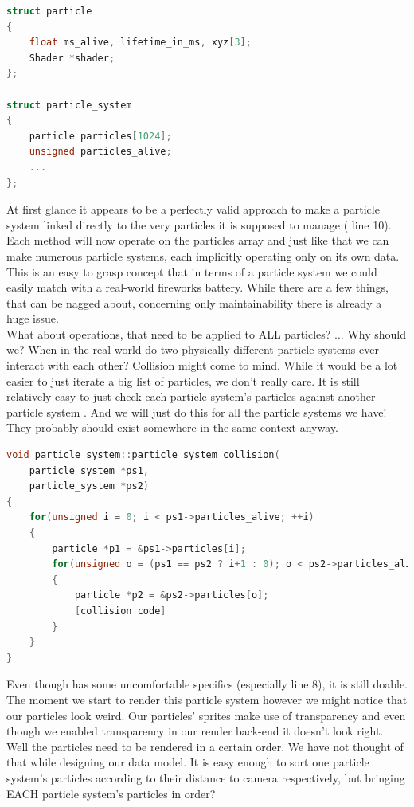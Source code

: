  \begin{lstlisting}[language=C++,name={ OOP typical, simplified particle system implementation},label={particle_system}]
struct particle
{
	float ms_alive, lifetime_in_ms, xyz[3];
	Shader *shader;
};

struct particle_system
{
	particle particles[1024];
	unsigned particles_alive;
	...
};
\end{lstlisting}
At first glance it appears to be a perfectly valid approach to make a particle system linked directly to the very particles it is supposed to manage ( line 10). Each method will now operate on the particles array and just like that we can make numerous particle systems, each implicitly operating only on its own data. This is an easy to grasp concept that in terms of a particle system we could easily match with a real-world fireworks battery. While there are a few things, that can be nagged about, concerning only maintainability there is already a huge issue.\\
What about operations, that need to be applied to ALL particles? ... Why should we? When in the real world do two physically different particle systems ever interact with each other? Collision might come to mind. While it would be a lot easier to just iterate a big list of particles, we don't really care. It is still relatively easy to just check each particle system's particles against another particle system . And we will just do this for all the particle systems we have! They probably should exist somewhere in the same context anyway.\\
 \begin{lstlisting}[language=C++,name={Example code how OOP could handle collision between different particle systems' particles},label={collision}]
void particle_system::particle_system_collision(
	particle_system *ps1,
	particle_system *ps2)
{
	for(unsigned i = 0; i < ps1->particles_alive; ++i)
	{
		particle *p1 = &ps1->particles[i];
		for(unsigned o = (ps1 == ps2 ? i+1 : 0); o < ps2->particles_alive; ++o)
		{
			particle *p2 = &ps2->particles[o];
			[collision code]
		}
	}
}
\end{lstlisting}
Even though  has some uncomfortable specifics (especially line 8), it is still doable. The moment we start to render this particle system however we might notice that our particles look weird. Our particles' sprites make use of transparency and even though we enabled transparency in our render back-end it doesn't look right. Well the particles need to be rendered in a certain order. We have not thought of that while designing our data model. It is easy enough to sort one particle system's particles according to their distance to camera respectively, but bringing EACH particle system's particles in order?\\
